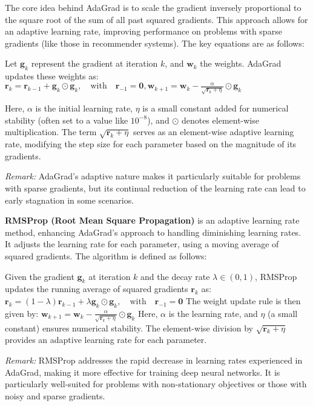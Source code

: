 \documentclass[a4paper,6pt]{extarticle}
\begin{document}
\begin{multicols}{2}
{The core idea behind AdaGrad is to scale the gradient inversely proportional to the square root of the sum of all past squared gradients. This approach allows for an adaptive learning rate, improving performance on problems with sparse gradients (like those in recommender systems). The key equations are as follows:

Let $\boldsymbol{g}_k$ represent the gradient at iteration $k$, and $\boldsymbol{w}_k$ the weights. AdaGrad updates these weights as:
$\boldsymbol{r}_k = \boldsymbol{r}_{k-1} + \boldsymbol{g}_k \odot \boldsymbol{g}_k, \quad \text{with} \quad \boldsymbol{r}_{-1} = \mathbf{0},
\boldsymbol{w}_{k+1} = \boldsymbol{w}_k - \frac{\alpha}{\sqrt{\boldsymbol{r}_k + \eta}} \odot \boldsymbol{g}_k$

Here, $\alpha$ is the initial learning rate, $\eta$ is a small constant added for numerical stability (often set to a value like $10^{-8}$), and $\odot$ denotes element-wise multiplication. The term $\sqrt{\boldsymbol{r}_k + \eta}$ serves as an element-wise adaptive learning rate, modifying the step size for each parameter based on the magnitude of its gradients.

\textit{Remark:} AdaGrad's adaptive nature makes it particularly suitable for problems with sparse gradients, but its continual reduction of the learning rate can lead to early stagnation in some scenarios.

\textbf{RMSProp (Root Mean Square Propagation)} is an adaptive learning rate method, enhancing AdaGrad's approach to handling diminishing learning rates. It adjusts the learning rate for each parameter, using a moving average of squared gradients. The algorithm is defined as follows:

Given the gradient $\boldsymbol{g}_k$ at iteration $k$ and the decay rate $\lambda \in (0,1)$, RMSProp updates the running average of squared gradients $\boldsymbol{r}_k$ as:
$\boldsymbol{r}_k = (1 - \lambda) \boldsymbol{r}_{k-1} + \lambda \boldsymbol{g}_k \odot \boldsymbol{g}_k, \quad \text{with} \quad \boldsymbol{r}_{-1} = \mathbf{0}$
The weight update rule is then given by:
$\boldsymbol{w}_{k+1} = \boldsymbol{w}_k - \frac{\alpha}{\sqrt{\boldsymbol{r}_k + \eta}} \odot \boldsymbol{g}_k$
Here, $\alpha$ is the learning rate, and $\eta$ (a small constant) ensures numerical stability. The element-wise division by $\sqrt{\boldsymbol{r}_k + \eta}$ provides an adaptive learning rate for each parameter.

\textit{Remark:} RMSProp addresses the rapid decrease in learning rates experienced in AdaGrad, making it more effective for training deep neural networks. It is particularly well-suited for problems with non-stationary objectives or those with noisy and sparse gradients.

}
\end{multicols}
\end{document}
